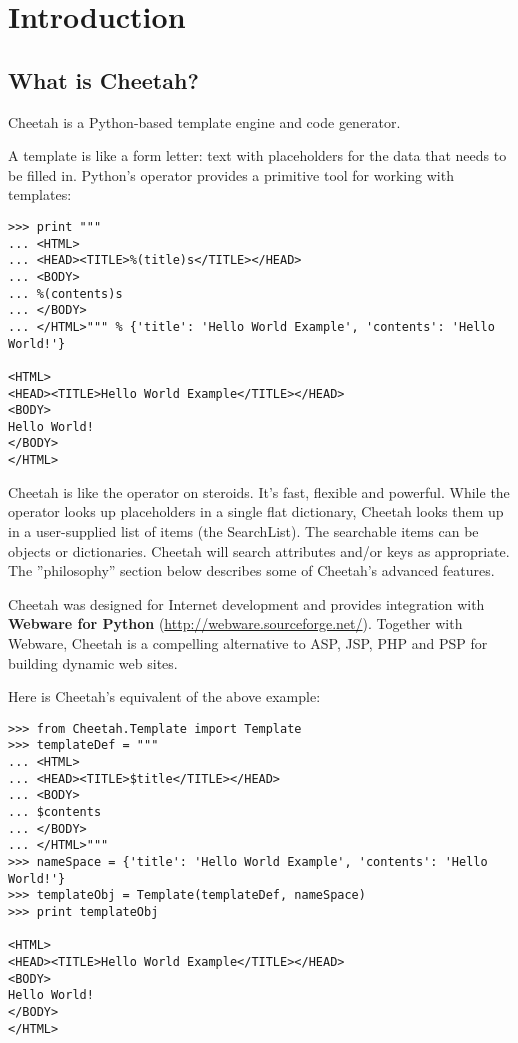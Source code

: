 \section{Introduction}
\label{intro}

\subsection{What is Cheetah?}
\label{intro.whatIs}

Cheetah is a Python-based template engine and code generator.  

A template is like a form letter: text with placeholders for the data that
needs to be filled in.  Python's \code{\%} operator provides a primitive tool
for working with templates:

\begin{verbatim}
>>> print """
... <HTML>
... <HEAD><TITLE>%(title)s</TITLE></HEAD>
... <BODY>
... %(contents)s
... </BODY>
... </HTML>""" % {'title': 'Hello World Example', 'contents': 'Hello World!'}

<HTML>
<HEAD><TITLE>Hello World Example</TITLE></HEAD>
<BODY>
Hello World!
</BODY>
</HTML>
\end{verbatim}

Cheetah is like the \code{\%} operator on steroids.  It's fast, flexible and
powerful.  While the \code{\%} operator looks up placeholders in a single flat
dictionary, Cheetah looks them up in a user-supplied list of items (the
SearchList).  The searchable items can be objects or dictionaries. Cheetah
will search attributes and/or keys as appropriate. The ''philosophy'' section
below describes some of Cheetah's advanced features.

Cheetah was designed for Internet development and provides integration with
{\bf Webware for Python} (\url{http://webware.sourceforge.net/}).  Together
with Webware, Cheetah is a compelling alternative to ASP, JSP, PHP and PSP for
building dynamic web sites.  

Here is Cheetah's equivalent of the above example:

\begin{verbatim}
>>> from Cheetah.Template import Template
>>> templateDef = """
... <HTML>
... <HEAD><TITLE>$title</TITLE></HEAD>
... <BODY>
... $contents
... </BODY>
... </HTML>"""
>>> nameSpace = {'title': 'Hello World Example', 'contents': 'Hello World!'}
>>> templateObj = Template(templateDef, nameSpace)
>>> print templateObj
 
<HTML>
<HEAD><TITLE>Hello World Example</TITLE></HEAD>
<BODY>
Hello World!
</BODY>
</HTML>
\end{verbatim}


